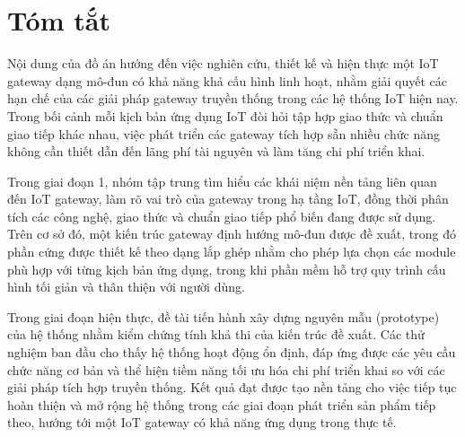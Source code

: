 \chapter*{Tóm tắt}
Nội dung của đồ án hướng đến việc nghiên cứu, thiết kế và hiện thực một IoT gateway dạng mô-đun có khả năng khả cấu hình linh hoạt, nhằm giải quyết các hạn chế của các giải pháp gateway truyền thống trong các hệ thống IoT hiện nay. Trong bối cảnh mỗi kịch bản ứng dụng IoT đòi hỏi tập hợp giao thức và chuẩn giao tiếp khác nhau, việc phát triển các gateway tích hợp sẵn nhiều chức năng không cần thiết dẫn đến lãng phí tài nguyên và làm tăng chi phí triển khai.

Trong giai đoạn 1, nhóm tập trung tìm hiểu các khái niệm nền tảng liên quan đến IoT gateway, làm rõ vai trò của gateway trong hạ tầng IoT, đồng thời phân tích các công nghệ, giao thức và chuẩn giao tiếp phổ biến đang được sử dụng. Trên cơ sở đó, một kiến trúc gateway định hướng mô-đun được đề xuất, trong đó phần cứng được thiết kế theo dạng lắp ghép nhằm cho phép lựa chọn các module phù hợp với từng kịch bản ứng dụng, trong khi phần mềm hỗ trợ quy trình cấu hình tối giản và thân thiện với người dùng.

Trong giai đoạn hiện thực, đề tài tiến hành xây dựng nguyên mẫu (prototype) của hệ thống nhằm kiểm chứng tính khả thi của kiến trúc đề xuất. Các thử nghiệm ban đầu cho thấy hệ thống hoạt động ổn định, đáp ứng được các yêu cầu chức năng cơ bản và thể hiện tiềm năng tối ưu hóa chi phí triển khai so với các giải pháp tích hợp truyền thống. Kết quả đạt được tạo nền tảng cho việc tiếp tục hoàn thiện và mở rộng hệ thống trong các giai đoạn phát triển sản phẩm tiếp theo, hướng tới một IoT gateway có khả năng ứng dụng trong thực tế.
